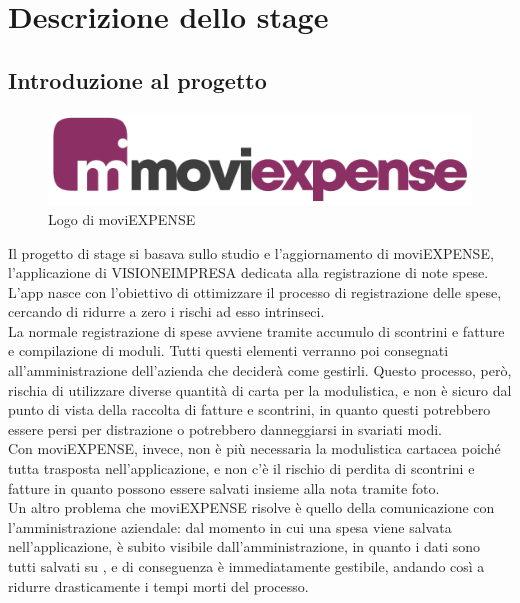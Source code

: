 \chapter{Descrizione dello stage}
\label{cap:descrizione-stage}


\section{Introduzione al progetto}

\begin{figure}[!h]
    \centering 
    \includegraphics[width=0.5\columnwidth]{images/moviExpense_logo.png} 
    \caption{Logo di moviEXPENSE}
\end{figure}

Il progetto di stage si basava sullo studio e l'aggiornamento di moviEXPENSE, l'applicazione di VISIONEIMPRESA dedicata alla registrazione di note spese. L'app nasce con l'obiettivo di ottimizzare il processo di registrazione delle spese, cercando di ridurre a zero i rischi ad esso intrinseci.\\
La normale registrazione di spese avviene tramite accumulo di scontrini e fatture e compilazione di moduli. Tutti questi elementi verranno poi consegnati all'amministrazione dell'azienda che deciderà come gestirli. Questo processo, però, rischia di utilizzare diverse quantità di carta per la modulistica, e non è sicuro dal punto di vista della raccolta di fatture e scontrini, in quanto questi potrebbero essere persi per distrazione o potrebbero danneggiarsi in svariati modi.\\
Con moviEXPENSE, invece, non è più necessaria la modulistica cartacea poiché tutta trasposta nell'applicazione, e non c'è il rischio di perdita di scontrini e fatture in quanto possono essere salvati insieme alla nota tramite foto.\\
Un altro problema che moviEXPENSE risolve è quello della comunicazione con l'amministrazione aziendale: dal momento in cui una spesa viene salvata nell'applicazione, è subito visibile dall'amministrazione, in quanto i dati sono tutti salvati su \emph{}, e di conseguenza è immediatamente gestibile, andando così a ridurre drasticamente i tempi morti del processo.

